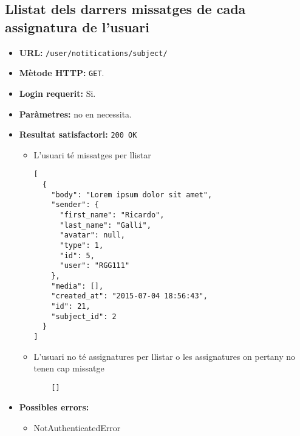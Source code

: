 \subsection{Llistat dels darrers missatges de cada assignatura de l'usuari}
\begin{itemize}
\item \textbf{\ac{URL}:} \texttt{/user/notitications/subject/}
\item \textbf{Mètode \ac{HTTP}: } \texttt{GET}.
\item \textbf{Login requerit:} Si.
\item \textbf{Paràmetres:} no en necessita.

\item \textbf{Resultat satisfactori:} \texttt{200 OK}
	\begin{itemize}
		\item L'usuari té missatges per llistar
	\begin{verbatim}
[
  {
    "body": "Lorem ipsum dolor sit amet",
    "sender": {
      "first_name": "Ricardo",
      "last_name": "Galli",
      "avatar": null,
      "type": 1,
      "id": 5,
      "user": "RGG111"
    },
    "media": [],
    "created_at": "2015-07-04 18:56:43",
    "id": 21,
    "subject_id": 2
  }
]
	\end{verbatim}
	
	\item L'usuari no té assignatures per llistar o les assignatures on pertany no tenen cap missatge
	
	\begin{verbatim}
	[]
	\end{verbatim}
	\end{itemize}


\item \textbf{Possibles errors:}
	\begin{itemize}
		\item NotAuthenticatedError
	\end{itemize}
\end{itemize}

